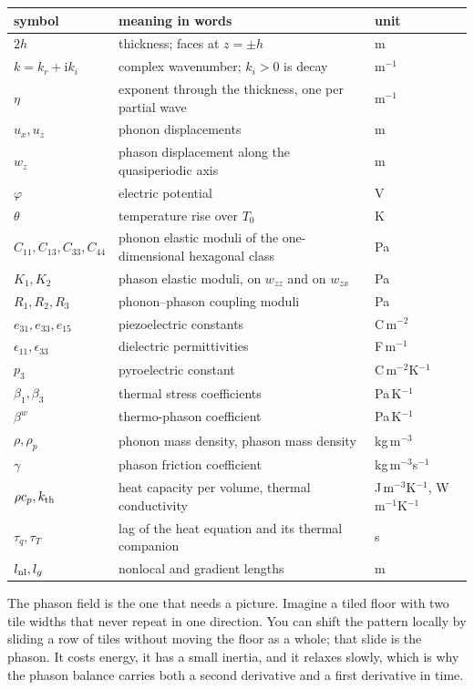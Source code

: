 \documentclass[11pt]{article}
\newcommand{\ii}{\mathrm{i}}
\begin{document}
\begin{center}
\small
\begin{tabular}{p{2.1cm}p{7.7cm}p{4.2cm}}
\toprule
symbol & meaning in words & unit\\
\midrule
$2h$ & thickness; faces at $z=\pm h$ & m\\
$k=k_r+\ii k_i$ & complex wavenumber; $k_i>0$ is decay & m$^{-1}$\\
$\eta$ & exponent through the thickness, one per partial wave & m$^{-1}$\\
$u_x,u_z$ & phonon displacements & m\\
$w_z$ & phason displacement along the quasiperiodic axis & m\\
$\varphi$ & electric potential & V\\
$\theta$ & temperature rise over $T_0$ & K\\
$C_{11},C_{13},C_{33},C_{44}$ & phonon elastic moduli of the one-dimensional hexagonal class & Pa\\
$K_1,K_2$ & phason elastic moduli, on $w_{zz}$ and on $w_{zx}$ & Pa\\
$R_1,R_2,R_3$ & phonon--phason coupling moduli & Pa\\
$e_{31},e_{33},e_{15}$ & piezoelectric constants & C\,m$^{-2}$\\
$\epsilon_{11},\epsilon_{33}$ & dielectric permittivities & F\,m$^{-1}$\\
$p_3$ & pyroelectric constant & C\,m$^{-2}$K$^{-1}$\\
$\beta_1,\beta_3$ & thermal stress coefficients & Pa\,K$^{-1}$\\
$\beta^{w}$ & thermo-phason coefficient & Pa\,K$^{-1}$\\
$\rho,\rho_p$ & phonon mass density, phason mass density & kg\,m$^{-3}$\\
$\gamma$ & phason friction coefficient & kg\,m$^{-3}$s$^{-1}$\\
$\rho c_p,k_{\rm th}$ & heat capacity per volume, thermal conductivity & J\,m$^{-3}$K$^{-1}$, W\,m$^{-1}$K$^{-1}$\\
$\tau_q,\tau_T$ & lag of the heat equation and its thermal companion & s\\
$l_{\rm nl},l_g$ & nonlocal and gradient lengths & m\\
\bottomrule
\end{tabular}
\end{center}

The phason field is the one that needs a picture. Imagine a tiled floor with two tile widths that never
repeat in one direction. You can shift the pattern locally by sliding a row of tiles without moving the
floor as a whole; that slide is the phason. It costs energy, it has a small inertia, and it relaxes slowly,
which is why the phason balance carries both a second derivative and a first derivative in time.
\end{document}
